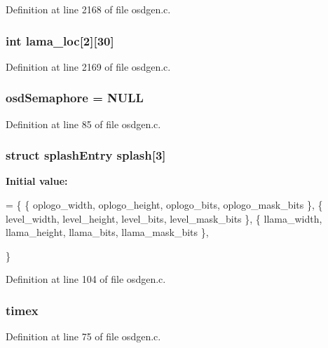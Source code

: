 Definition at line 2168 of file osdgen.\-c.

\hypertarget{group___o_s_d_g_e_n_module_ga35258f3e002e3b7d6dc3a50b458c1ed5}{
\subsubsection[{lama\-\_\-loc}]{\setlength{\rightskip}{0pt plus 5cm}int lama\-\_\-loc\mbox{[}2\mbox{]}\mbox{[}30\mbox{]}}}\label{group___o_s_d_g_e_n_module_ga35258f3e002e3b7d6dc3a50b458c1ed5}


Definition at line 2169 of file osdgen.\-c.

\hypertarget{group___o_s_d_g_e_n_module_ga34f96a89a1ad6c4649787dbc18e218e5}{
\subsubsection[{osd\-Semaphore}]{ osd\-Semaphore = N\-U\-L\-L}}\label{group___o_s_d_g_e_n_module_ga34f96a89a1ad6c4649787dbc18e218e5}


Definition at line 85 of file osdgen.\-c.

\hypertarget{group___o_s_d_g_e_n_module_gafd73dea95bd8cae01a8225936c4c302e}{
\subsubsection[{splash}]{\setlength{\rightskip}{0pt plus 5cm}struct {\bf splash\-Entry} splash\mbox{[}3\mbox{]}}}\label{group___o_s_d_g_e_n_module_gafd73dea95bd8cae01a8225936c4c302e}
{\bfseries Initial value\-:}
\begin{DoxyCode}
= \{
        \{       oplogo\_width,
                oplogo\_height,
                oplogo\_bits,
                oplogo\_mask\_bits \},
        \{       level\_width,
                level\_height,
                level\_bits,
                level\_mask\_bits \},
        \{       llama\_width,
                llama\_height,
                llama\_bits,
                llama\_mask\_bits \},

\}
\end{DoxyCode}


Definition at line 104 of file osdgen.\-c.

\hypertarget{group___o_s_d_g_e_n_module_gac6e460448d29f05aad59dc67c3035057}{
\subsubsection[{timex}]{ timex}}\label{group___o_s_d_g_e_n_module_gac6e460448d29f05aad59dc67c3035057}


Definition at line 75 of file osdgen.\-c.


